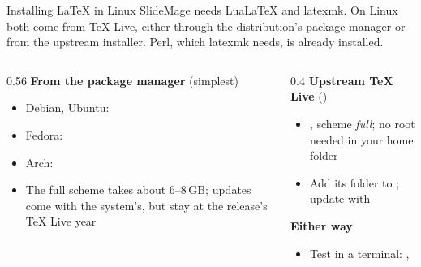 
\begin{standardframe}{Installing LaTeX in Linux}
	\small
	SlideMage needs LuaLaTeX and latexmk. On Linux both come from TeX Live,
	either through the distribution's package manager or from the upstream installer.
	Perl, which latexmk needs, is already installed.
	\par\medskip
	\begin{columns}[T,onlytextwidth]
		\begin{column}{0.56\linewidth}
			\textbf{From the package manager} (simplest)
			\begin{itemize}
				\item Debian, Ubuntu: 
				\item Fedora: 
				\item Arch: 
				\item The full scheme takes about 6--8\,GB; updates come with the system's, but stay at the release's TeX Live year
			\end{itemize}
		\end{column}
		\begin{column}{0.4\linewidth}
			\textbf{Upstream TeX Live} ()
			\begin{itemize}
				\item {}, scheme \emph{full}; no root needed in your home folder
				\item Add its  folder to ; update with 
			\end{itemize}
			\medskip
			\textbf{Either way}
			\begin{itemize}
				\item Test in a terminal: , 
			\end{itemize}
		\end{column}
	\end{columns}
\end{standardframe}
